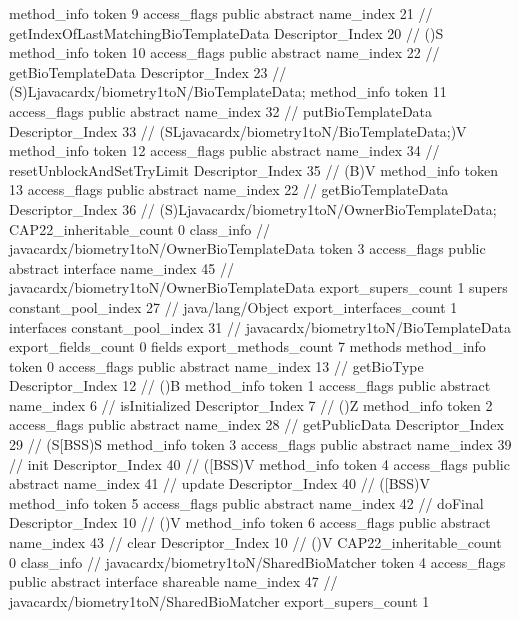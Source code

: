 {{{{{				}
				method_info {
					token	9
					access_flags	public abstract
					name_index	21		// getIndexOfLastMatchingBioTemplateData
					Descriptor_Index	20		// ()S
				}
				method_info {
					token	10
					access_flags	public abstract
					name_index	22		// getBioTemplateData
					Descriptor_Index	23		// (S)Ljavacardx/biometry1toN/BioTemplateData;
				}
				method_info {
					token	11
					access_flags	public abstract
					name_index	32		// putBioTemplateData
					Descriptor_Index	33		// (SLjavacardx/biometry1toN/BioTemplateData;)V
				}
				method_info {
					token	12
					access_flags	public abstract
					name_index	34		// resetUnblockAndSetTryLimit
					Descriptor_Index	35		// (B)V
				}
				method_info {
					token	13
					access_flags	public abstract
					name_index	22		// getBioTemplateData
					Descriptor_Index	36		// (S)Ljavacardx/biometry1toN/OwnerBioTemplateData;
				}
			}
			CAP22_inheritable_count	0
		}
		class_info {		// javacardx/biometry1toN/OwnerBioTemplateData
			token	3
			access_flags	public abstract interface
			name_index	45		// javacardx/biometry1toN/OwnerBioTemplateData
			export_supers_count	1
			supers {
				constant_pool_index	27		// java/lang/Object
			}
			export_interfaces_count	1
			interfaces {
				constant_pool_index	31		// javacardx/biometry1toN/BioTemplateData
			}
			export_fields_count	0
			fields {
			}
			export_methods_count	7
			methods {
				method_info {
					token	0
					access_flags	public abstract
					name_index	13		// getBioType
					Descriptor_Index	12		// ()B
				}
				method_info {
					token	1
					access_flags	public abstract
					name_index	6		// isInitialized
					Descriptor_Index	7		// ()Z
				}
				method_info {
					token	2
					access_flags	public abstract
					name_index	28		// getPublicData
					Descriptor_Index	29		// (S[BSS)S
				}
				method_info {
					token	3
					access_flags	public abstract
					name_index	39		// init
					Descriptor_Index	40		// ([BSS)V
				}
				method_info {
					token	4
					access_flags	public abstract
					name_index	41		// update
					Descriptor_Index	40		// ([BSS)V
				}
				method_info {
					token	5
					access_flags	public abstract
					name_index	42		// doFinal
					Descriptor_Index	10		// ()V
				}
				method_info {
					token	6
					access_flags	public abstract
					name_index	43		// clear
					Descriptor_Index	10		// ()V
				}
			}
			CAP22_inheritable_count	0
		}
		class_info {		// javacardx/biometry1toN/SharedBioMatcher
			token	4
			access_flags	public abstract interface shareable
			name_index	47		// javacardx/biometry1toN/SharedBioMatcher
			export_supers_count	1
}}}
